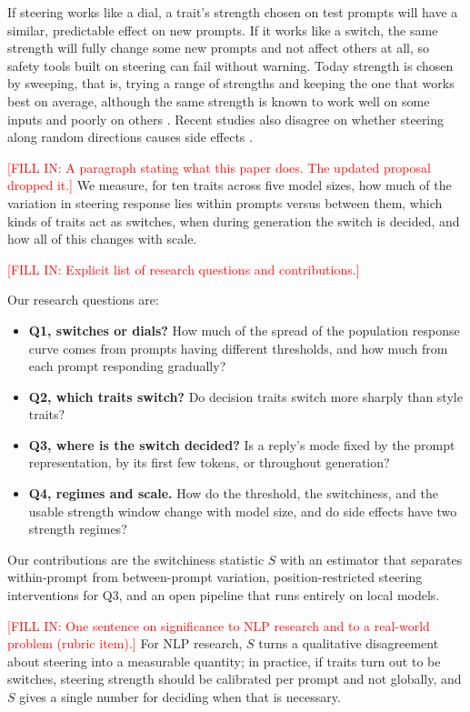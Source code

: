 \documentclass[11pt]{article}
\newcommand{\fillin}[1]{\textcolor{red}{[FILL IN: #1]}}
\newcommand{\upd}[1]{{\color{updgreen}#1}}
\begin{document}
If steering works like a dial, a trait's strength chosen on test prompts will have a
similar, predictable effect on new prompts. If it works like a switch, the same
strength will fully change some new prompts and not affect others at all, so safety
tools built on steering can fail without warning. \upd{Today strength is chosen by
sweeping, that is, trying a range of strengths and keeping the one that works best
on average, although the same strength is known to work well on some inputs and
poorly on others \cite{braun2025unreliability}. Recent studies also disagree on
whether steering along random directions causes side effects
\cite{malla2026interference,ong2026forecasting}.}

\fillin{A paragraph stating what this paper does. The updated proposal dropped it.}
\upd{We measure, for ten traits across five model sizes, how much of the variation
in steering response lies within prompts versus between them, which kinds of
traits act as switches, when during generation the switch is decided, and how all
of this changes with scale.}

\fillin{Explicit list of research questions and contributions.}
\upd{Our research questions are:
\begin{itemize}
\item \textbf{Q1, switches or dials?} How much of the spread of the population
response curve comes from prompts having different thresholds, and how much from
each prompt responding gradually?
\item \textbf{Q2, which traits switch?} Do decision traits switch more sharply than
style traits?
\item \textbf{Q3, where is the switch decided?} Is a reply's mode fixed by the
prompt representation, by its first few tokens, or throughout generation?
\item \textbf{Q4, regimes and scale.} How do the threshold, the switchiness, and the
usable strength window change with model size, and do side effects have two
strength regimes?
\end{itemize}
Our contributions are the switchiness statistic $S$ with an estimator that
separates within-prompt from between-prompt variation, position-restricted
steering interventions for Q3, and an open pipeline that runs entirely on local
models.}

\fillin{One sentence on significance to NLP research and to a real-world problem
(rubric item).}
\upd{For NLP research, $S$ turns a qualitative disagreement about steering into a
measurable quantity; in practice, if traits turn out to be switches, steering
strength should be calibrated per prompt and not globally, and $S$ gives a single
number for deciding when that is necessary.}
\end{document}
